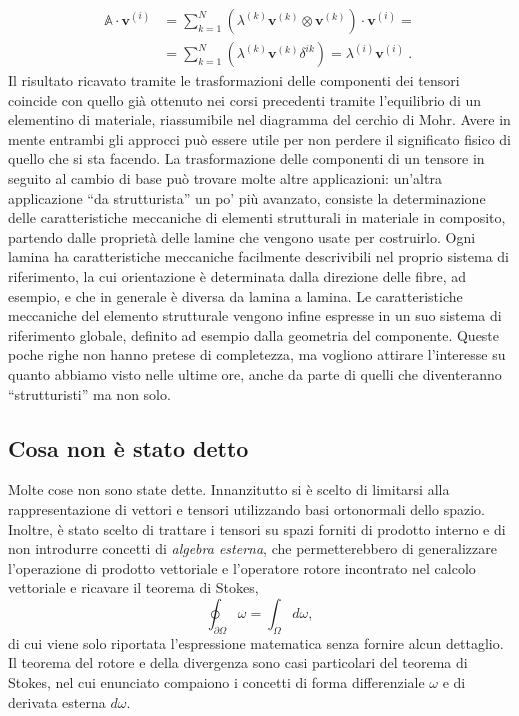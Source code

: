 {\begin{equation}
\begin{aligned}
    \mathbb{A} \cdot \bm{v}^{(i)} & =
    \sum_{k=1}^{N} \left( \lambda^{(k)} \bm{v}^{(k)} \otimes \bm{v}^{(k)} \right) \cdot \bm{v}^{(i)}  = \\
& = \sum_{k=1}^{N} \left( \lambda^{(k)} \bm{v}^{(k)} \delta^{ik}\right) = 
    \lambda^{(i)} \bm{v}^{(i)} \ .
\end{aligned}
\end{equation}
 }
  Il risultato ricavato tramite le trasformazioni delle componenti dei tensori coincide con quello  già ottenuto nei corsi precedenti tramite l'equilibrio di un elementino di materiale, riassumibile nel diagramma del cerchio di Mohr. Avere in mente entrambi gli approcci può essere utile per non perdere il significato fisico di quello che si sta facendo.
%
\newline \noindent 
 La trasformazione delle componenti di un tensore in seguito al cambio di base può trovare molte altre applicazioni: un'altra applicazione ``da strutturista'' un po' più avanzato, consiste la determinazione delle caratteristiche meccaniche di elementi strutturali in materiale in composito, partendo dalle proprietà delle lamine che vengono usate per costruirlo.
 Ogni lamina ha caratteristiche meccaniche facilmente descrivibili nel proprio sistema di riferimento, la cui orientazione è determinata dalla direzione delle fibre, ad esempio, e che in generale è diversa da lamina a lamina. Le caratteristiche meccaniche del elemento strutturale vengono infine espresse in un suo sistema di riferimento globale, definito ad esempio dalla geometria del componente. 
%
\newline \noindent 
 Queste poche righe non hanno pretese di completezza, ma vogliono attirare l'interesse su quanto abbiamo visto nelle ultime ore, anche da parte di quelli che diventeranno ``strutturisti'' ma non solo.

\clearpage \newpage

\subsection{Cosa non è stato detto}
 Molte cose non sono state dette. Innanzitutto si è scelto di limitarsi alla rappresentazione di vettori e tensori utilizzando basi ortonormali dello spazio. Inoltre, è stato scelto di trattare i tensori su spazi forniti di prodotto interno e di non introdurre concetti di \textit{algebra esterna}, che permetterebbero di generalizzare l'operazione di prodotto vettoriale e l'operatore rotore incontrato nel calcolo vettoriale e ricavare il teorema di Stokes,
\begin{equation}
 \oint_{\partial \Omega} \omega = \int_\Omega d\omega ,
\end{equation}
 di cui viene solo riportata l'espressione matematica senza fornire alcun dettaglio. Il teorema del rotore e della divergenza sono casi particolari del teorema di Stokes, nel cui enunciato compaiono i concetti di forma differenziale $\omega$ e di derivata esterna $d \omega$.

